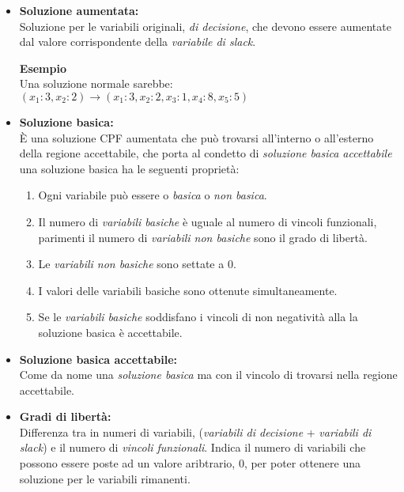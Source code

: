 \documentclass{article}
\begin{document}
\begin{itemize}
  \item \textbf{Soluzione aumentata:} \\
        Soluzione per le variabili originali, \textit{di decisione}, che devono essere aumentate dal valore corrispondente della \textit{variabile di slack}. \\
        \begin{tcolorbox}
          \textbf{Esempio}\\
          Una soluzione normale sarebbe: $(x_1:3,x_2:2) \to (x_1:3,x_2:2, x_3:1, x_4:8, x_5:5) $
        \end{tcolorbox}
  \item \textbf{Soluzione basica:} \\
        È una soluzione CPF aumentata che può trovarsi all'interno o all'esterno della regione accettabile, che porta al condetto di \textit{soluzione basica accettabile} una soluzione basica ha le seguenti proprietà:
        \begin{enumerate}
          \item Ogni variabile può essere o \textit{basica} o \textit{non basica}.
          \item Il numero di \textit{variabili basiche} è uguale al numero di vincoli funzionali, parimenti il numero di \textit{variabili non basiche} sono il grado di libertà.
          \item Le \textit{variabili non basiche} sono settate a $0$.
          \item I valori delle variabili basiche sono ottenute simultaneamente.
          \item Se le \textit{variabili basiche} soddisfano i vincoli di non negatività alla la soluzione basica è accettabile.
        \end{enumerate}
  \item \textbf{Soluzione basica accettabile:}\\
        Come da nome una \textit{soluzione basica} ma con il vincolo di trovarsi nella regione accettabile.
  \item \textbf{Gradi di libertà:} \\
        Differenza tra in numeri di variabili, (\textit{variabili di decisione} + \textit{variabili di slack}) e il numero di \textit{vincoli funzionali}. Indica il numero di variabili che possono essere poste ad un valore aribtrario, $0$, per poter ottenere una soluzione per le variabili rimanenti.
\end{itemize}
\end{document}
